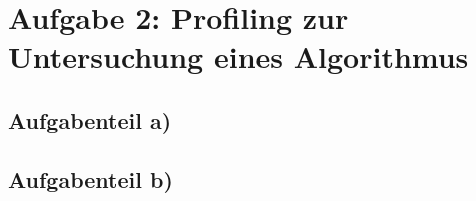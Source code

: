 \section*{Aufgabe 2: Profiling zur Untersuchung eines Algorithmus}

\subsection*{Aufgabenteil a)}

\subsection*{Aufgabenteil b)}
